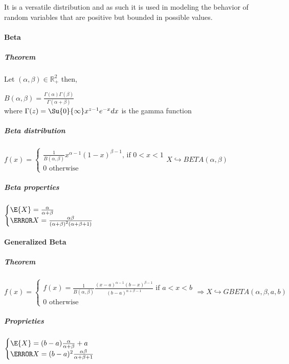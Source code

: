 It is a versatile distribution and as such it is used in modeling the 
behavior of random variables that are positive but bounded in possible 
values.
\paragraph{Beta}
\subparagraph{Theorem}
Let $(\alpha,\beta)\in\mathbb{R}_{+}^{2}$ then,
\begin{center}
$B(\alpha,\beta)=\frac{\Gamma(\alpha)\Gamma(\beta)}{\Gamma(\alpha+\beta)}$\\
where $\Gamma(z)=\Su{0}{\infty}x^{z-1}e^{-x}dx$ is the gamma function
\end{center}
\subparagraph{Beta distribution}
\begin{center}
	$f(x)=\begin{cases}\frac{1}{B(\alpha,\beta)}x^{\alpha-1}(1-x)^{\beta-1}\text{, if }0<x<1\\0\text{ otherwise}\end{cases}X\hookrightarrow BETA(\alpha, \beta)$
\end{center}
\subparagraph{Beta properties}
\begin{center}
	$\begin{cases}\E{X}=\frac{\alpha}{\alpha+\beta}\\
	\V{X}=\frac{\alpha\beta}{\left(\alpha+\beta\right)^{2}(\alpha+\beta+1)}\end{cases}$
\end{center}
\paragraph{Generalized Beta}
\subparagraph{Theorem}
\begin{center}
	$f(x)=\begin{cases}f(x)=\frac{1}{B(\alpha,\beta)}\frac{(x-a)^{\alpha -1}(b-x)^{\beta -1}}{(b-a)^{\alpha + \beta - 1}}\text{ if }a<x<b\\
		0\text{ otherwise}\end{cases} \Rightarrow X\hookrightarrow GBETA(\alpha, \beta, a, b)$
\end{center}
\subparagraph{Proprieties}
\begin{center}
$\begin{cases}
	\E{X}=(b-a)\frac{\alpha}{\alpha + \beta}+a\\
	\V{X}=(b-a)^{2}\frac{\alpha\beta}{\alpha +\beta +1}
\end{cases}$
\end{center}
